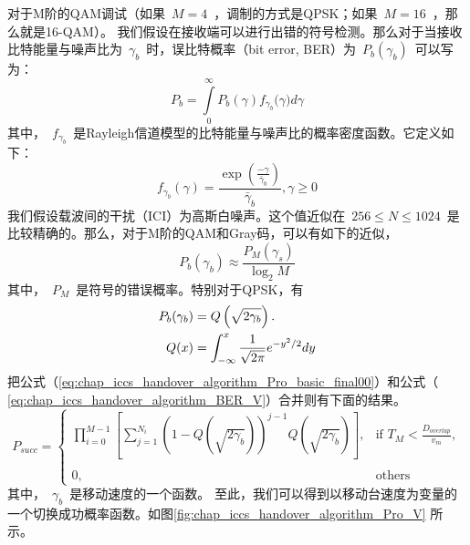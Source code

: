对于M阶的QAM调试（如果~$M=4$~，调制的方式是QPSK；如果~$M=16$~，那么就是16-QAM）。
我们假设在接收端可以进行出错的符号检测。那么对于当接收比特能量与噪声比为~$\gamma_b$~时，误比特概率（bit error, BER）为~$P_b(\gamma_b)$~可以写为：
\[
{{P}_{b}}=\int\limits_{0}^{\infty }{{{P}_{b}}(\gamma ){{f}_{{{\gamma }_{b}}}}(}\gamma )d\gamma
\]
其中，~$f_{\gamma_b}$~是Rayleigh信道模型的比特能量与噪声比的概率密度函数。它定义如下：
\[{{f}_{{{\gamma }_{b}}}}(\gamma )=\frac{\exp (\frac{-\gamma }{{{{\bar{\gamma }}}_{b}}})}{{{{\bar{\gamma }}}_{b}}},\gamma \ge 0\]
我们假设载波间的干扰（ICI）为高斯白噪声。这个值近似在~$256 \le N \le 1024$~是比较精确的\cite{Leung:WCNC2005}。那么，对于M阶的QAM和Gray码，可以有如下的近似，
\begin{equation}
P_b(\gamma_b) \approx \frac{P_M(\gamma_s)}{\log_2 M}
\end{equation}
其中，~$P_M$~是符号的错误概率。特别对于QPSK，有
\begin{align}
\label{eq:chap_iccs_handover_algorithm_BER_V}
P_{b}(\gamma_{b})&= Q\left(\sqrt{2\gamma_{b}}\right).\\
Q(x) &= \int^x_{-\infty} \frac{1}{\sqrt{2\pi}}e^{-y^2/2}dy \notag
\end{align}
把公式（\ref{eq:chap_iccs_handover_algorithm_Pro_basic_final00}）和公式（ \ref{eq:chap_iccs_handover_algorithm_BER_V}）合并则有下面的结果。
\begin{equation}
P_{succ}=\left\{
\begin{array}{ll}
\prod_{i=0}^{M-1}\left[\sum_{j=1}^{N_{i}}(1-Q\left(\sqrt{2\gamma_{b}}\right))^{j-1}Q\left(\sqrt{2\gamma_{b}}\right)\right],
& \mbox{if }T_{M}<\frac{D_{overlap}}{v_{m}},\\
\\0, & \mbox{others}
\end{array}\right.\label{eq:chap_handover:velocity_bit_error_rate}
\end{equation}
其中，~$\gamma_b$~是移动速度的一个函数。
至此，我们可以得到以移动台速度为变量的一个切换成功概率函数。如图\ref{fig:chap_iccs_handover_algorithm_Pro_V} 所示。
